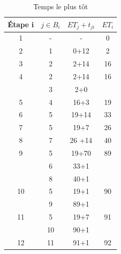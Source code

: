 \documentclass{article}
\begin{document}
\begin{table}
    \caption{Temps le plus tôt} \label{tab:Temps le plus tot}
    \begin{center}
        \begin{tabular}{|c|c|c|c|}
            \hline
            Étape i & $j \in B_i$ & $ET_j+t_{ji}$ & $ET_i$ \\
            \hline
            1        & -           & -             & 0      \\
            2        & 1          & 0+12          & 2      \\
            3        & 2          & 2+14          & 16     \\
            4        & 2          & 2+14          & 16     \\
                     & 3          & 2+0           &        \\
            5        & 4           & 16+3          & 19     \\
            6        & 5           & 19+14         & 33     \\
            7        & 5           & 19+7          & 26     \\
            8        & 7           & 26 +14        & 40     \\
            9        & 5           & 19+70         & 89     \\
                     & 6          & 33+1          &        \\
                     & 8          & 40+1          &        \\
            10       & 5           & 19+1          & 90     \\
                     & 9           & 89+1          &        \\
            11       & 5           & 19+7          & 91     \\
                     & 10           & 90+1          &        \\
            12       & 11           & 91+1          & 92     \\
            \hline
                                                     
                        
                                        
        \end{tabular}
    \end{center}
\end{table}
\end{document}
